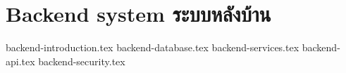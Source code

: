 \section{\ifenglish Backend system \else ระบบหลังบ้าน \fi}

\newcommand{\backendDir}{chapters/approach/backend}
{backend-introduction.tex}
{backend-database.tex}
{backend-services.tex}
{backend-api.tex}
{backend-security.tex}